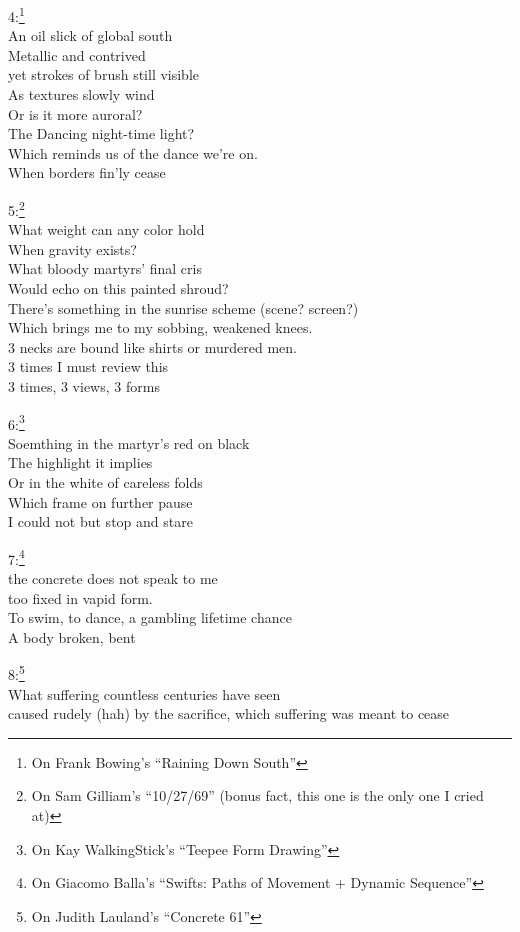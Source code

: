 \documentclass[12pt]{article}
\newcommand{\say}[1]{``#1''}
\renewcommand{\,}{\textsuperscript{,}}
\begin{document}
4:\footnote{On Frank Bowing's \say{Raining Down South}}\\
An oil slick of global south\\
Metallic and contrived\\
yet strokes of brush still visible\\
As textures slowly wind\\
Or is it more auroral?\\
The Dancing night-time light?\\
Which reminds us of the dance we're on.\\ 
When borders fin'ly cease

5:\footnote{On Sam Gilliam's \say{10/27/69} (bonus fact, this one is the only one I cried at)}\\
What weight can any color hold\\
When gravity exists?\\
What bloody martyrs' final cris\\
Would echo on this painted shroud?\\
There's something in the sunrise scheme (scene? screen?)\\
Which brings me to my sobbing, weakened knees.\\
3 necks are bound like shirts or murdered men.\\
3 times I must review this\\
3 times, 3 views, 3 forms

6:\footnote{On Kay WalkingStick's \say{Teepee Form Drawing}}\\
Soemthing in the martyr's red on black\\
The highlight it implies\\
Or in the white of careless folds\\
Which frame on further pause\\
I could not but stop and stare

7:\footnote{On Giacomo Balla's \say{Swifts: Paths of Movement + Dynamic Sequence}}\\
the concrete does not speak to me\\
too fixed in vapid form.\\
To swim, to dance, a gambling lifetime chance\\
A body broken, bent

8:\footnote{On Judith Lauland's \say{Concrete 61}}\\
What suffering countless centuries have seen\\
caused rudely (hah) by the sacrifice, which suffering was meant to cease\\
\end{document}
